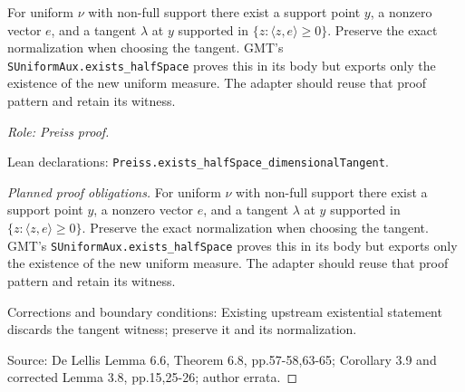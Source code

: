 \begin{lemma}
\label{lem:halfspace-tangent-witness}






For uniform $\nu$ with non-full support there exist a support point $y$,
a nonzero vector $e$, and a tangent $\lambda$ at $y$ supported in
$\{z:\langle z,e\rangle\geq0\}$. Preserve the exact normalization when
choosing the tangent. GMT's \texttt{SUniformAux.exists\_halfSpace} proves
this in its body but exports only the existence of the new uniform measure.
The adapter should reuse that proof pattern and retain its witness.
\par\emph{Role: Preiss proof.}
\par Lean declarations: \texttt{Preiss.exists\_halfSpace\_dimensionalTangent}.
\end{lemma}
\begin{proof}[Planned proof obligations]

For uniform $\nu$ with non-full support there exist a support point $y$,
a nonzero vector $e$, and a tangent $\lambda$ at $y$ supported in
$\{z:\langle z,e\rangle\geq0\}$. Preserve the exact normalization when
choosing the tangent. GMT's \texttt{SUniformAux.exists\_halfSpace} proves
this in its body but exports only the existence of the new uniform measure.
The adapter should reuse that proof pattern and retain its witness.
\par Corrections and boundary conditions: Existing upstream existential statement discards the tangent witness; preserve it and its normalization.
\par Source: De Lellis Lemma 6.6, Theorem 6.8, pp.57-58,63-65; Corollary 3.9 and corrected Lemma 3.8, pp.15,25-26; author errata.
\end{proof}

